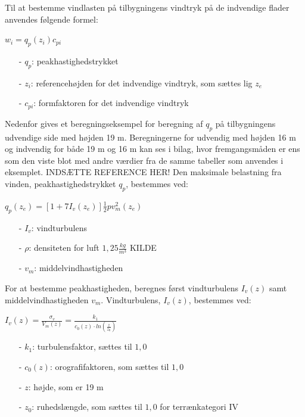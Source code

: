 Til at bestemme vindlasten på tilbygningens vindtryk på de indvendige flader anvendes følgende formel:
\begin{center} 
	$w_i=q_p(z_i)c_{pi}$
\end{center}
\begin{itemize}
	\item[-] $q_p$: peakhastighedstrykket
	\item[-] $z_i$: referencehøjden for det indvendige vindtryk, som sættes lig $z_e$ \citep[ kapitel 7.2.9]{EU91}
	\item[-] $c_{pi}$: formfaktoren for det indvendige vindtryk
\end{itemize}

Nedenfor gives et beregningseksempel for beregning af $q_p$ på tilbygningens udvendige side med højden 19 m. Beregningerne for udvendig med højden 16 m og indvendig for både 19 m og 16 m kan ses i bilag, hvor fremgangsmåden er ens som den viste blot med andre værdier fra de samme tabeller som anvendes i eksemplet. INDSÆTTE REFERENCE HER!
\newline
\newline
Den maksimale belastning fra vinden, peakhastighedstrykket $q_p$, bestemmes ved:
\begin{center}
$q_p(z_e)=[1+7I_v(z_e)]\frac{1}{2}pv_m^2(z_e)$
\end{center}
\begin{itemize}
	\item[-] $I_v$: vindturbulens
	\item[-] $\rho$: densiteten for luft $1,\!25 \frac{kg}{m^3}$ KILDE
	\item[-] $v_m$: middelvindhastigheden
\end{itemize}
For at bestemme peakhastigheden, beregnes først vindturbulens $I_v(z)$ samt middelvindhastigheden $v_m$.
\newline
\newline
Vindturbulens, $I_v(z)$, bestemmes ved:
\begin{center}
$I_v(z)=\frac{\sigma_v}{V_m(z)}=\frac{k_1}{c_0(z)\cdot ln(\frac{z}{z_0})}$
\end{center}
\begin{itemize}
	\item[-] $k_1$: turbulensfaktor, sættes til $1,\!0$ \citep[ kapitel 4.4]{EU91}
	\item[-] $c_0(z)$: orografifaktoren, som sættes til $1,\!0$ \citep[ kapitel 4.3.1]{EU91}
	\item[-] $z$: højde, som er 19 m
	\item[-] $z_0$: ruhedslængde, som sættes til $1,\!0$ for terrænkategori IV \citep[ tabel 4.1 kapitel 4.3.2]{EU91}
\end{itemize}
